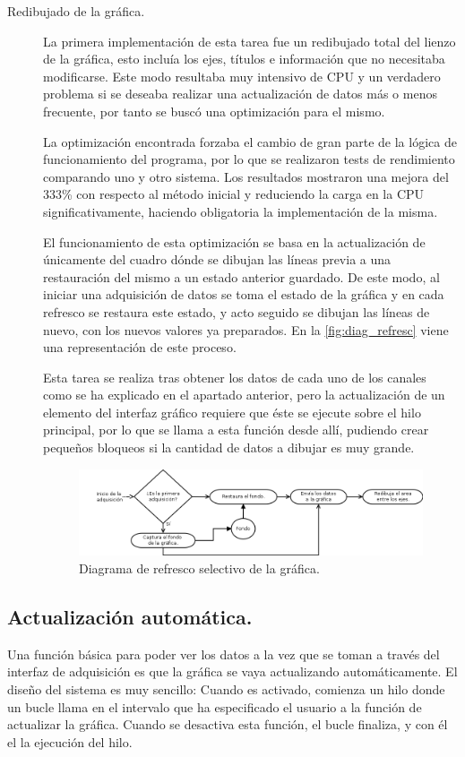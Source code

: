 \begin{description}
		\item[Redibujado de la gráfica.] La primera implementación de esta tarea fue un redibujado total del lienzo de la gráfica, esto incluía los ejes, títulos e información que no necesitaba modificarse. Este modo resultaba muy intensivo de CPU y un verdadero problema si se deseaba realizar una actualización de datos más o menos frecuente, por tanto se buscó una optimización para el mismo.
		
		La optimización encontrada forzaba el cambio de gran parte de la lógica de funcionamiento del programa, por lo que se realizaron tests de rendimiento comparando uno y otro sistema. Los resultados mostraron una mejora del 333\% con respecto al método inicial y reduciendo la carga en la CPU significativamente, haciendo obligatoria la implementación de la misma. 
		
		El funcionamiento de esta optimización se basa en la actualización de únicamente del cuadro dónde se dibujan las líneas previa a una restauración del mismo a un estado anterior guardado. De este modo, al iniciar una adquisición de datos se toma el estado de la gráfica y en cada refresco se restaura este estado, y acto seguido se dibujan las líneas de nuevo, con los nuevos valores ya preparados. En la \autoref{fig:diag_refresc} viene una representación de este proceso.
	
		Esta tarea se realiza tras obtener los datos de cada uno de los canales como se ha explicado en el apartado anterior, pero la actualización de un elemento del interfaz gráfico requiere que éste se ejecute sobre el hilo principal, por lo que se llama a esta función desde allí, pudiendo crear pequeños bloqueos si la cantidad de datos a dibujar es muy grande.
	
		
		\begin{figure}[H]
			\centering
		  	\includegraphics[width=1\textwidth]{img/graph_redraw-diagram.png}
  			\caption{Diagrama de refresco selectivo de la gráfica.}\label{fig:diag_refresc}
		\end{figure}
	\end{description}


	\subsection{Actualización automática.}
		Una función básica para poder ver los datos a la vez que se toman a través del interfaz de adquisición es que la gráfica se vaya actualizando automáticamente. El diseño del sistema es muy sencillo: Cuando es activado, comienza un hilo donde un bucle llama en el intervalo que ha especificado el usuario a la función de actualizar la gráfica. Cuando se desactiva esta función, el bucle finaliza, y con él el la ejecución del hilo.
		
